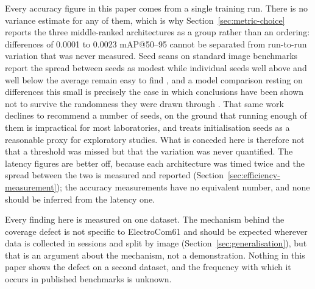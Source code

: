 %
%
%

Every accuracy figure in this paper comes from a single training run. There is
no variance estimate for any of them, which is why
Section~\ref{sec:metric-choice} reports the three middle-ranked architectures as
a group rather than an ordering: differences of 0.0001 to 0.0023 mAP@50--95
cannot be separated from run-to-run variation that was never measured. Seed
scans on standard image benchmarks report the spread between seeds as modest
while individual seeds well above and well below the average remain easy to
find \citep{picard2021seed}, and a model comparison resting on differences this
small is precisely the case in which conclusions have been shown not to survive
the randomness they were drawn through \citep{gundersen2023reporting}. That same
work declines to recommend a number of seeds, on the ground that running enough
of them is impractical for most laboratories, and treats initialisation seeds as
a reasonable proxy for exploratory studies. What is conceded here is therefore
not that a threshold was missed but that the variation was never quantified. The
latency figures are better off, because each architecture was timed twice and
the spread between the two is measured and reported
(Section~\ref{sec:efficiency-measurement}); the accuracy measurements have no
equivalent number, and none should be inferred from the latency one.

Every finding here is measured on one dataset. The mechanism behind the coverage
defect is not specific to ElectroCom61 and should be expected wherever data is
collected in sessions and split by image (Section~\ref{sec:generalisation}), but
that is an argument about the mechanism, not a demonstration. Nothing in this
paper shows the defect on a second dataset, and the frequency with which it
occurs in published benchmarks is unknown.

